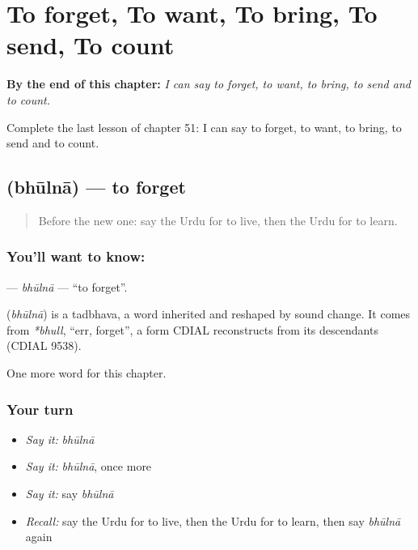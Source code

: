 
\chapter{To forget, To want, To bring, To send, To count}
\label{ch:ur-to-forget-to-want-to-bring-to-send-to-count}

\begin{chapteropening}
\textbf{By the end of this chapter:} \emph{I can say to forget, to want, to bring, to send and to count.}

Complete the last lesson of chapter 51: I can say to forget, to want, to bring, to send and to count.
\end{chapteropening}

\section[\texorpdfstring{\ur{بھولنا} (bhūlnā)}{بھولنا (bhūlnā)}]{ (bhūlnā) — to forget}

\label{lesson:UR-C51-bhulna}



\begin{quote}
Before the new one: say the Urdu for to live, then the Urdu for to learn.
\end{quote}

\subsection*{You'll want to know: }
\textbf{} — \emph{bhūlnā} — \textquotedblleft{}to forget\textquotedblright{}.

\begin{cousinweb}
\textbf{} (\emph{bhūlnā}) is a tadbhava, a word inherited and reshaped by sound change. It comes from \emph{*bhull}, \textquotedblleft{}err, forget\textquotedblright{}, a form CDIAL reconstructs from its descendants (CDIAL 9538).
\end{cousinweb}

\begin{grammarlens}[title={What you've built}]
One more word for this chapter.
\end{grammarlens}

\subsection*{Your turn}
\begin{itemize}
\raggedright
  \item \emph{Say it:} \emph{bhūlnā}
  \item \emph{Say it:} \emph{bhūlnā}, once more
  \item \emph{Say it:} say \emph{bhūlnā}
  \item \emph{Recall:} say the Urdu for to live, then the Urdu for to learn, then say \emph{bhūlnā} again
\end{itemize}

